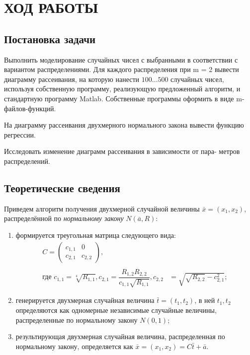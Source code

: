 \section{ХОД РАБОТЫ}

\subsection{Постановка задачи}

Выполнить моделирование случайных чисел с выбранными в соответствии с вариантом
распределениями. Для каждого распределения при m = 2 вывести диаграмму рассеивания, 
на которую нанести $ 100 \dots 500 $ случайных чисел, используя
собственную программу, реализующую предложенный алгоритм, и стандартную программу Matlab.
Собственные программы оформить в виде m-файлов-функций. 

На диаграмму рассеивания двухмерного нормального закона вывести функцию регрессии.

Исследовать изменение диаграмм рассеивания в зависимости от пара-
метров распределений.

\subsection{Теоретические сведения}
\label{sub:theory}

Приведем алгоритм получения двухмерной случайной величины $ \bar x = (x_1, x_2) $,
распределённой по \textit{нормальному закону} $ N (\bar a, R) $:

\begin{enumerate}
  \item формируется треугольная матрица следующего вида:
    \begin{align*}
      C = 
      \begin{pmatrix}
        c_{1,1}&0\\
        c_{2,1}&c_{2,2}
      \end{pmatrix}, \\ \\
      \text{где } c_{1,1} = \sqrt[4]{R_{1,1}},
      c_{2,1} = \dfrac{R_{1,2} R_{2,2}}{c_{1,1} \sqrt{R_{1,1}}},
      c_{2,2} &= \sqrt{\sqrt{R_{2,2}} - c_{2,1}^2};
    \end{align*}
    
  \item генерируется двухмерная случайная величина $ \bar t = (t_1, t_2) $,
    в ней $ t_1, t_2 $ определяются как одномерные независимые случайные величины, распределенные 
    по нормальному закону $ N(0, 1) $;

  \item результирующая двухмерная случайная величина, распределенная по нормальному закону,
    определяется как $ \bar x = (x_1, x_2) = C \bar t + \bar a $. 
\end{enumerate}


